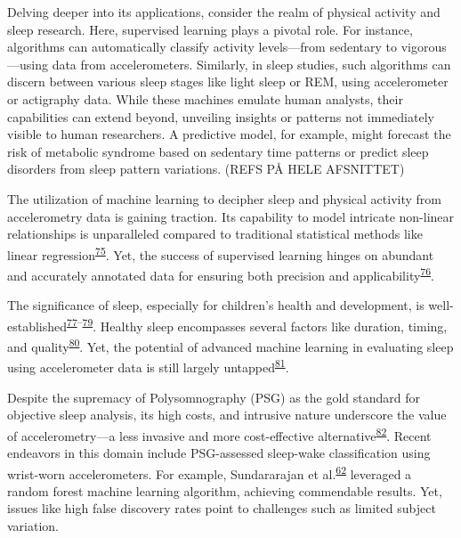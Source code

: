 \documentclass[
  9pt,
]{scrbook}
\begin{document}
Delving deeper into its applications, consider the realm of physical
activity and sleep research. Here, supervised learning plays a pivotal
role. For instance, algorithms can automatically classify activity
levels---from sedentary to vigorous---using data from accelerometers.
Similarly, in sleep studies, such algorithms can discern between various
sleep stages like light sleep or REM, using accelerometer or actigraphy
data. While these machines emulate human analysts, their capabilities
can extend beyond, unveiling insights or patterns not immediately
visible to human researchers. A predictive model, for example, might
forecast the risk of metabolic syndrome based on sedentary time patterns
or predict sleep disorders from sleep pattern variations. (REFS PÅ HELE
AFSNITTET)

The utilization of machine learning to decipher sleep and physical
activity from accelerometry data is gaining traction. Its capability to
model intricate non-linear relationships is unparalleled compared to
traditional statistical methods like linear
regression\textsuperscript{\protect\hyperlink{ref-fiorillo_automated_2019}{75}}.
Yet, the success of supervised learning hinges on abundant and
accurately annotated data for ensuring both precision and
applicability\textsuperscript{\protect\hyperlink{ref-van_der_ploeg_modern_2014}{76}}.

The significance of sleep, especially for children's health and
development, is
well-established\textsuperscript{\protect\hyperlink{ref-chaput_systematic_2017}{77}--\protect\hyperlink{ref-st-onge_sleep_2016}{79}}.
Healthy sleep encompasses several factors like duration, timing, and
quality\textsuperscript{\protect\hyperlink{ref-gruber_position_2014}{80}}.
Yet, the potential of advanced machine learning in evaluating sleep
using accelerometer data is still largely
untapped\textsuperscript{\protect\hyperlink{ref-haghayegh_application_2020}{81}}.

Despite the supremacy of Polysomnography (PSG) as the gold standard for
objective sleep analysis, its high costs, and intrusive nature
underscore the value of accelerometry---a less invasive and more
cost-effective
alternative\textsuperscript{\protect\hyperlink{ref-vaughn_technical_2008}{82}}.
Recent endeavors in this domain include PSG-assessed sleep-wake
classification using wrist-worn accelerometers. For example,
Sundararajan et
al.\textsuperscript{\protect\hyperlink{ref-sundararajan_sleep_2021}{62}}
leveraged a random forest machine learning algorithm, achieving
commendable results. Yet, issues like high false discovery rates point
to challenges such as limited subject variation.
\end{document}
